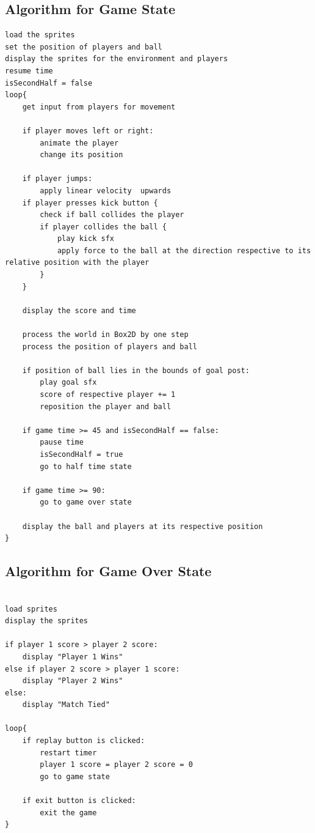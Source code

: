 \documentclass[main]{subfiles}
\begin{document}
	\subsection{Algorithm for Game State}
	\begin{verbatim}
load the sprites
set the position of players and ball
display the sprites for the environment and players
resume time
isSecondHalf = false
loop{
    get input from players for movement

    if player moves left or right:
        animate the player
        change its position

    if player jumps:
        apply linear velocity  upwards
    if player presses kick button {
        check if ball collides the player
        if player collides the ball {
            play kick sfx
            apply force to the ball at the direction respective to its relative position with the player
        }
    }
    
    display the score and time

    process the world in Box2D by one step
    process the position of players and ball

    if position of ball lies in the bounds of goal post:
        play goal sfx
        score of respective player += 1
        reposition the player and ball

    if game time >= 45 and isSecondHalf == false:
        pause time
        isSecondHalf = true
        go to half time state

    if game time >= 90:
        go to game over state
        
    display the ball and players at its respective position
}
	\end{verbatim}

\pagebreak

	\subsection{Algorithm for Game Over State}
\begin{verbatim}

load sprites 
display the sprites

if player 1 score > player 2 score:
    display "Player 1 Wins"
else if player 2 score > player 1 score:
    display "Player 2 Wins"
else:
    display "Match Tied"

loop{
    if replay button is clicked:
        restart timer
        player 1 score = player 2 score = 0
        go to game state

    if exit button is clicked:
        exit the game
}

\end{verbatim}
	
\end{document}
